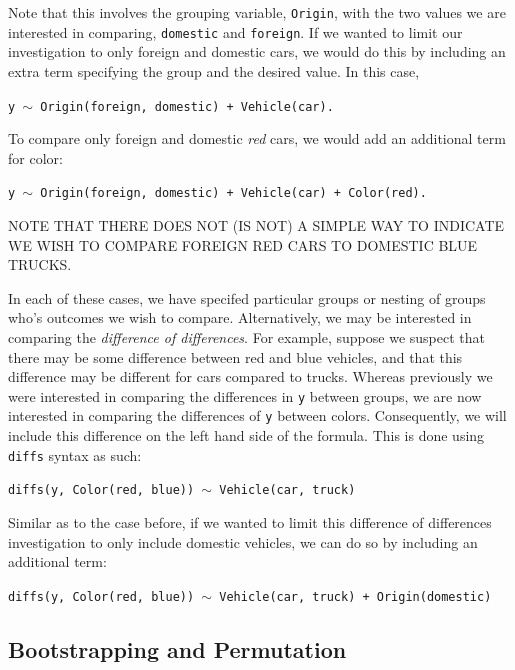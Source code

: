 \documentclass{article}
\newcommand{\xt}{\texttt}%
\begin{document}
Note that this involves the grouping variable, \xt{Origin}, with the two values we are interested in comparing, \xt{domestic} and \xt{foreign}. If we wanted to limit our investigation to only foreign and domestic cars, we would do this by including an extra term specifying the group and the desired value. In this case, 

\begin{center}
\tt y $\sim$ Origin(foreign, domestic) + Vehicle(car).
\end{center}
To compare only foreign and domestic \textit{red} cars, we would add an additional term for color:

\begin{center}
\tt y $\sim$ Origin(foreign, domestic) + Vehicle(car) + Color(red).
\end{center}

NOTE THAT THERE DOES NOT (IS NOT) A SIMPLE WAY TO INDICATE WE WISH TO COMPARE FOREIGN RED CARS TO DOMESTIC BLUE TRUCKS.

In each of these cases, we have specifed particular groups or nesting of groups who's outcomes we wish to compare. Alternatively, we may be interested in comparing the \textit{difference of differences}. For example, suppose we suspect that there may be some difference between red and blue vehicles, and that this difference may be different for cars compared to trucks. Whereas previously we were interested in comparing the differences in \xt{y} between groups, we are now interested in comparing the differences of \xt{y} between colors. Consequently, we will include this difference on the left hand side of the formula. This is done using \xt{diffs} syntax as such:

\begin{center}
\tt diffs(y, Color(red, blue)) $\sim$ Vehicle(car, truck)
\end{center}

Similar as to the case before, if we wanted to limit this difference of differences investigation to only include domestic vehicles, we can do so by including an additional term:

\begin{center}
\tt diffs(y, Color(red, blue)) $\sim$ Vehicle(car, truck) + Origin(domestic)
\end{center}

\subsection{Bootstrapping and Permutation}
\end{document}
